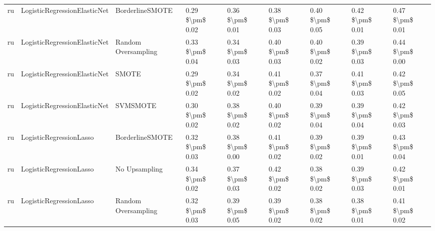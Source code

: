 \begin{tabular}{lllllllll}
      ru &    LogisticRegressionElasticNet &               BorderlineSMOTE & 0.29 \$\textbackslash pm\$ 0.02 &           0.36 \$\textbackslash pm\$ 0.01 &       0.38 \$\textbackslash pm\$ 0.03 &        0.40 \$\textbackslash pm\$ 0.05 &                         0.42 \$\textbackslash pm\$ 0.01 &     0.47 \$\textbackslash pm\$ 0.01 \\
      ru &    LogisticRegressionElasticNet &           Random Oversampling & 0.33 \$\textbackslash pm\$ 0.04 &           0.34 \$\textbackslash pm\$ 0.03 &       0.40 \$\textbackslash pm\$ 0.03 &        0.40 \$\textbackslash pm\$ 0.02 &                         0.39 \$\textbackslash pm\$ 0.03 &     0.44 \$\textbackslash pm\$ 0.00 \\
      ru &    LogisticRegressionElasticNet &                         SMOTE & 0.29 \$\textbackslash pm\$ 0.02 &           0.34 \$\textbackslash pm\$ 0.02 &       0.41 \$\textbackslash pm\$ 0.02 &        0.37 \$\textbackslash pm\$ 0.04 &                         0.41 \$\textbackslash pm\$ 0.03 &     0.42 \$\textbackslash pm\$ 0.05 \\
      ru &    LogisticRegressionElasticNet &                      SVMSMOTE & 0.30 \$\textbackslash pm\$ 0.02 &           0.38 \$\textbackslash pm\$ 0.02 &       0.40 \$\textbackslash pm\$ 0.02 &        0.39 \$\textbackslash pm\$ 0.04 &                         0.39 \$\textbackslash pm\$ 0.04 &     0.42 \$\textbackslash pm\$ 0.03 \\
      ru &         LogisticRegressionLasso &               BorderlineSMOTE & 0.32 \$\textbackslash pm\$ 0.03 &           0.38 \$\textbackslash pm\$ 0.00 &       0.41 \$\textbackslash pm\$ 0.02 &        0.39 \$\textbackslash pm\$ 0.02 &                         0.39 \$\textbackslash pm\$ 0.01 &     0.43 \$\textbackslash pm\$ 0.04 \\
      ru &         LogisticRegressionLasso &                 No Upsampling & 0.34 \$\textbackslash pm\$ 0.02 &           0.37 \$\textbackslash pm\$ 0.03 &       0.42 \$\textbackslash pm\$ 0.02 &        0.38 \$\textbackslash pm\$ 0.02 &                         0.39 \$\textbackslash pm\$ 0.03 &     0.42 \$\textbackslash pm\$ 0.01 \\
      ru &         LogisticRegressionLasso &           Random Oversampling & 0.32 \$\textbackslash pm\$ 0.03 &           0.39 \$\textbackslash pm\$ 0.05 &       0.39 \$\textbackslash pm\$ 0.02 &        0.38 \$\textbackslash pm\$ 0.02 &                         0.38 \$\textbackslash pm\$ 0.01 &     0.41 \$\textbackslash pm\$ 0.02 \\

\end{tabular}
